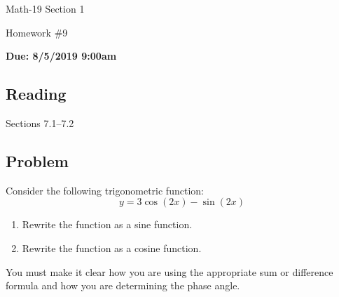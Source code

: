 \documentclass[letterpaper,12pt,fleqn]{article}
\begin{document}
\begin{center}
  \large
  Math-19 Section 1

  \Large
  Homework \#9

  \large
  \textbf{Due: 8/5/2019 9:00am}
\end{center}

\subsection*{Reading}

Sections 7.1--7.2

\subsection*{Problem}

Consider the following trigonometric function:
\[y=3\cos(2x)-\sin(2x)\]
\begin{enumerate}
\item Rewrite the function as a sine function.
\item Rewrite the function as a cosine function.
\end{enumerate}
You must make it clear how you are using the appropriate sum or difference formula and how you are determining the
phase angle.
\end{document}
